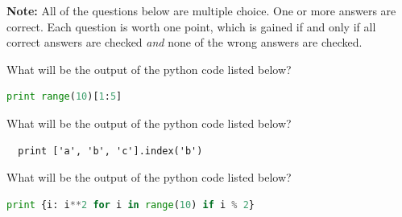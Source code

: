 \documentclass[a4paper,11pt,english,plainsub]{uioexam}
\newcommand{\ttc}[1]{\choice {\tt #1}}
\begin{document}
\tableofcontents

\bigskip



{\bf Note:} All of the questions below are multiple choice. One or
more answers are correct. Each question is worth one point, which is
gained if and only if all correct answers are checked {\it and} none
of the wrong answers are checked.




What will be the output of the python code listed below?

\begin{lstlisting}[language=Python]
print range(10)[1:5]  
\end{lstlisting}

\begin{choicelist}[]
  \choice {\tt [1, 2, 3, 4, 5]}
  \choice {\tt [0, 1, 2, 3, 4, 5]}
  \choice {\tt [1, 2, 3, 4]}
  \choice {\tt [0, 1, 2, 3, 4]}
\end{choicelist}



What will be the output of the python code listed below?

\begin{lstlisting}
  print ['a', 'b', 'c'].index('b')
\end{lstlisting}

\begin{choicelist}[]
  \ttc {b}
  \ttc {1}
  \ttc {0}
\end{choicelist}


What will be the output of the python code listed below?

\begin{lstlisting}[language=Python]
print {i: i**2 for i in range(10) if i % 2}
\end{lstlisting}

\begin{choicelist}[]
  \choice {\tt [1, 9, 25, 49, 81]}
\end{choicelist}
\end{document}
